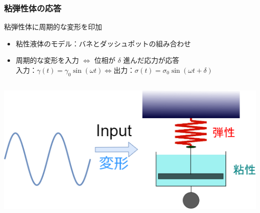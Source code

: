 \documentclass[12pt, dvipdfmx]{beamer}
\begin{document}
\begin{frame}
    \frametitle{粘弾性体の応答}
	\begin{block}{粘弾性体に周期的な変形を印加}
		\begin{itemize}
			\item 粘性液体のモデル：バネとダッシュポットの組み合わせ
			\item 周期的な変形を入力 $\Leftrightarrow$ 位相が $\delta$ 進んだ応力が応答\\
			$\text{入力：}\gamma (t) = \gamma_0 \sin(\omega t) \Leftrightarrow \text{出力：}\sigma(t) = \sigma_0 \sin(\omega t + \delta)$
		\end{itemize}
	\end{block}
	\begin{columns}[c, onlytextwidth]
			\centering
				\includegraphics[width=\textwidth]{dynamic_ViscoElast.png}
			
			\centering
	\end{columns}
\end{frame}
\end{document}

